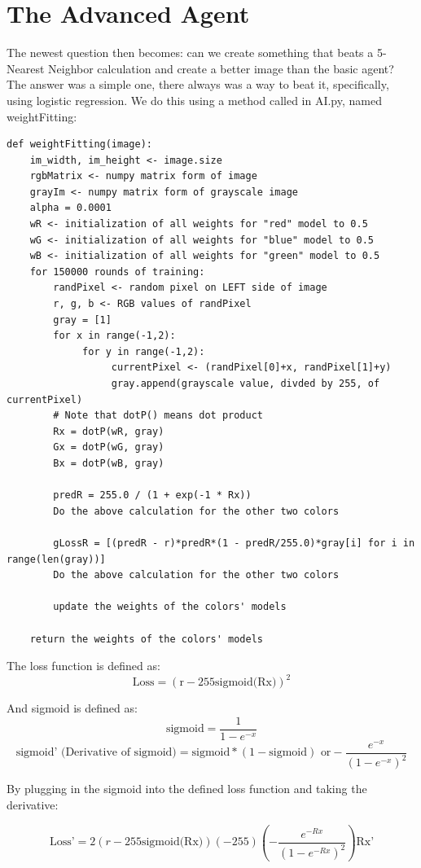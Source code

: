 \documentclass[11pt]{article}
\begin{document}
\section{The Advanced Agent}
The newest question then becomes: can we create something that beats a 5-Nearest Neighbor calculation and create a better image than the basic agent? The answer was a simple one, there always was a way to beat it, specifically, using logistic regression. We do this using a method called in AI.py, named weightFitting:

\begin{verbatim}
def weightFitting(image):
    im_width, im_height <- image.size
    rgbMatrix <- numpy matrix form of image
    grayIm <- numpy matrix form of grayscale image
    alpha = 0.0001
    wR <- initialization of all weights for "red" model to 0.5
    wG <- initialization of all weights for "blue" model to 0.5
    wB <- initialization of all weights for "green" model to 0.5
    for 150000 rounds of training:
        randPixel <- random pixel on LEFT side of image
        r, g, b <- RGB values of randPixel
        gray = [1]
        for x in range(-1,2):
             for y in range(-1,2):
                  currentPixel <- (randPixel[0]+x, randPixel[1]+y) 
                  gray.append(grayscale value, divded by 255, of currentPixel)
        # Note that dotP() means dot product
        Rx = dotP(wR, gray)
        Gx = dotP(wG, gray)
        Bx = dotP(wB, gray)

        predR = 255.0 / (1 + exp(-1 * Rx))
        Do the above calculation for the other two colors

        gLossR = [(predR - r)*predR*(1 - predR/255.0)*gray[i] for i in range(len(gray))]
        Do the above calculation for the other two colors

        update the weights of the colors' models

    return the weights of the colors' models
\end{verbatim}

The loss function is defined as:
\[
\text{Loss} = (\text{r} - 255\text{sigmoid(Rx)})^2
\]

And sigmoid is defined as:
\[
\text{sigmoid} = \frac{1}{1 - e^{-x}}
\]
\[
\text{sigmoid' (Derivative of sigmoid)} = \text{sigmoid} * (1 - \text{sigmoid}) \text{ or} -\frac{e^{-x}}{(1 - e^{-x})^2}
\]

By plugging in the sigmoid into the defined loss function and taking the derivative:

\[
\text{Loss'} = 2(r - 255\text{sigmoid(Rx)}) (-255) (-\frac{e^{-Rx}}{(1 - e^{-Rx})^2})\text{Rx'}
\]
\end{document}
